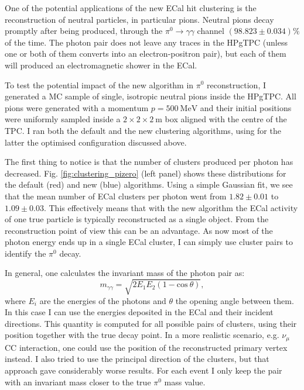 One of the potential applications of the new ECal hit clustering is the reconstruction of neutral particles, in particular pions. Neutral pions decay promptly after being produced, through the $\pi^{0} \rightarrow \gamma\gamma$ channel $(98.823 \pm 0.034)\%$ of the time. The photon pair does not leave any traces in the HPgTPC (unless one or both of them converts into an electron-positron pair), but each of them will produced an electromagnetic shower in the ECal.

To test the potential impact of the new algorithm in $\pi^{0}$ reconstruction, I generated a MC sample of single, isotropic neutral pions inside the HPgTPC. All pions were generated with a momentum $p = 500 \ \mathrm{MeV}$ and their initial positions were uniformly sampled inside a $2 \times 2 \times 2 \ \mathrm{m}$ box aligned with the centre of the TPC. I ran both the default and the new clustering algorithms, using for the latter the optimised configuration discussed above.

The first thing to notice is that the number of clusters produced per photon has decreased. Fig. \ref{fig:clustering_pizero} (left panel) shows these distributions for the default (red) and new (blue) algorithms. Using a simple Gaussian fit, we see that the mean number of ECal clusters per photon went from $1.82 \pm 0.01$ to $1.09 \pm 0.03$. This effectively means that with the new algorithm the ECal activity of one true particle is typically reconstructed as a single object. From the reconstruction point of view this can be an advantage. As now most of the photon energy ends up in a single ECal cluster, I can simply use cluster pairs to identify the $\pi^{0}$ decay.

In general, one calculates the invariant mass of the photon pair as:
\begin{equation}
	m_{\gamma\gamma} = \sqrt{2E_{1}E_{2}(1-\mathrm{cos} \ \theta)},
\end{equation}
where $E_{i}$ are the energies of the photons and $\theta$ the opening angle between them. In this case I can use the energies deposited in the ECal and their incident directions. This quantity is computed for all possible pairs of clusters, using their position together with the true decay point. In a more realistic scenario, e.g. $\nu_{\mu}$ CC interaction, one could use the position of the reconstructed primary vertex instead. I also tried to use the principal direction of the clusters, but that approach gave considerably worse results. For each event I only keep the pair with an invariant mass closer to the true $\pi^{0}$ mass value.

